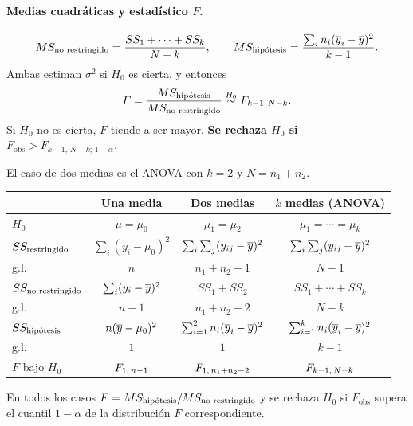 \paragraph{Medias cuadráticas y estadístico $F$.}
\[
  MS_{\text{no restringido}} = \frac{SS_1+\cdots+SS_k}{N-k}, \qquad
  MS_{\text{hipótesis}} = \frac{\sum_i n_i(\overline{y}_i-\overline{y})^2}{k-1}.
\]
Ambas estiman $\sigma^2$ si $H_0$ es cierta, y entonces
\[
  F = \frac{MS_{\text{hipótesis}}}{MS_{\text{no restringido}}} \overset{H_0}{\sim} F_{k-1,\,N-k} .
\]
Si $H_0$ no es cierta, $F$ tiende a ser mayor. \textbf{Se rechaza $H_0$ si
$F_{\text{obs}} > F_{k-1,\,N-k;\,1-\alpha}$}.

\begin{nota}
  El caso de dos medias es el ANOVA con $k=2$ y $N=n_1+n_2$.
\end{nota}

\begin{resumen}
  \centering
  \small
  \renewcommand{\arraystretch}{1.35}
  \begin{tabular}{lccc}
    \toprule
    & \textbf{Una media} & \textbf{Dos medias} & \textbf{$k$ medias (ANOVA)} \\
    \midrule
    $H_0$ & $\mu=\mu_0$ & $\mu_1=\mu_2$ & $\mu_1=\cdots=\mu_k$ \\
    \midrule
    $SS_{\text{restringido}}$ & $\sum_i(y_i-\mu_0)^2$ & $\sum_i\sum_j(y_{ij}-\overline{y})^2$
      & $\sum_i\sum_j(y_{ij}-\overline{y})^2$ \\
    \quad g.l. & $n$ & $n_1+n_2-1$ & $N-1$ \\
    $SS_{\text{no restringido}}$ & $\sum_i(y_i-\overline{y})^2$ & $SS_1+SS_2$ & $SS_1+\cdots+SS_k$ \\
    \quad g.l. & $n-1$ & $n_1+n_2-2$ & $N-k$ \\
    $SS_{\text{hipótesis}}$ & $n(\overline{y}-\mu_0)^2$ & $\sum_{i=1}^{2} n_i(\overline{y}_i-\overline{y})^2$
      & $\sum_{i=1}^{k} n_i(\overline{y}_i-\overline{y})^2$ \\
    \quad g.l. & $1$ & $1$ & $k-1$ \\
    \midrule
    $F$ bajo $H_0$ & $F_{1,\,n-1}$ & $F_{1,\,n_1+n_2-2}$ & $F_{k-1,\,N-k}$ \\
    \bottomrule
  \end{tabular}
  \par\medskip\raggedright
  En todos los casos $F=MS_{\text{hipótesis}}/MS_{\text{no restringido}}$ y se rechaza $H_0$ si
  $F_{\text{obs}}$ supera el cuantil $1-\alpha$ de la distribución $F$ correspondiente.
\end{resumen}
